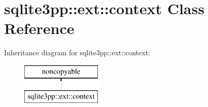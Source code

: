 \hypertarget{classsqlite3pp_1_1ext_1_1context}{\section{sqlite3pp\-:\-:ext\-:\-:context Class Reference}
\label{classsqlite3pp_1_1ext_1_1context}
}
Inheritance diagram for sqlite3pp\-:\-:ext\-:\-:context\-:\begin{figure}[H]
\begin{center}
\leavevmode
\includegraphics[height=2.000000cm]{classsqlite3pp_1_1ext_1_1context}
\end{center}
\end{figure}
